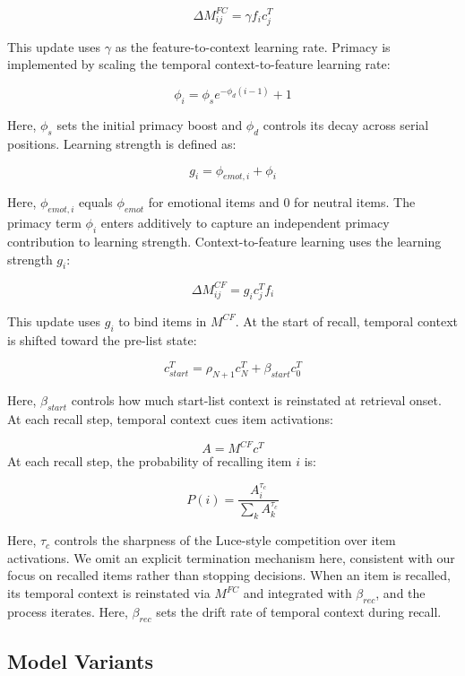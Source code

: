 \documentclass[
  man,
  longtable,
  nolmodern,
  notxfonts,
  notimes,
  draftfirst,
  colorlinks=true,linkcolor=blue,citecolor=blue,urlcolor=blue]{apa7}
\begin{document}
\[
\Delta M^{FC}_{ij} = \gamma f_i c^T_j
\]

This update uses \(\gamma\) as the feature-to-context learning rate.
Primacy is implemented by scaling the temporal context-to-feature
learning rate:

\[
\phi_i = \phi_s e^{-\phi_d(i-1)} + 1
\]

Here, \(\phi_s\) sets the initial primacy boost and \(\phi_d\) controls
its decay across serial positions. Learning strength is defined as:

\[
g_i = \phi_{emot,i} + \phi_i
\]

Here, \(\phi_{emot,i}\) equals \(\phi_{emot}\) for emotional items and 0
for neutral items. The primacy term \(\phi_i\) enters additively to
capture an independent primacy contribution to learning strength.
Context-to-feature learning uses the learning strength \(g_i\):

\[
\Delta M^{CF}_{ij} = g_i c^T_j f_i
\]

This update uses \(g_i\) to bind items in \(M^{CF}\). At the start of
recall, temporal context is shifted toward the pre-list state:

\[
c^T_{start} = \rho_{N+1} c^T_N + \beta_{start} c^T_0
\]

Here, \(\beta_{start}\) controls how much start-list context is
reinstated at retrieval onset. At each recall step, temporal context
cues item activations:

\[
A = M^{CF} c^T
\] At each recall step, the probability of recalling item \(i\) is:

\[
P(i) = \frac{A_i^{\tau_c}}{\sum_k A_k^{\tau_c}}
\]

Here, \(\tau_c\) controls the sharpness of the Luce-style competition
over item activations. We omit an explicit termination mechanism here,
consistent with our focus on recalled items rather than stopping
decisions. When an item is recalled, its temporal context is reinstated
via \(M^{FC}\) and integrated with \(\beta_{rec}\), and the process
iterates. Here, \(\beta_{rec}\) sets the drift rate of temporal context
during recall.

\subsection{Model Variants}\label{model-variants}
\end{document}
